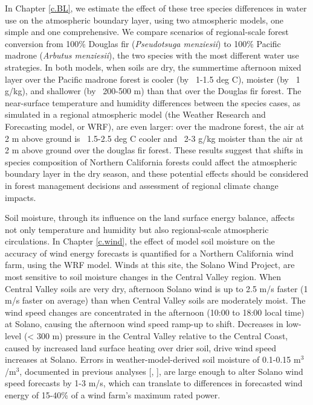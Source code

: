 In Chapter \ref{c.BL}, we estimate the effect of these tree species differences in water use on the atmospheric boundary layer, using two atmospheric models, one simple and one comprehensive. We compare scenarios of regional-scale forest conversion from 100\% Douglas fir (\textit{Pseudotsuga menziesii}) to 100\% Pacific madrone (\textit{Arbutus menziesii}), the two species with the most different water use strategies.  In both models, when soils are dry, the summertime afternoon mixed layer over the Pacific madrone forest is cooler (by ~1-1.5 deg C), moister (by ~1 g/kg), and shallower (by ~200-500 m) than that over the Douglas fir forest.  The near-surface temperature and humidity differences between the species cases, as simulated in a regional atmospheric model (the Weather Research and Forecasting model, or WRF), are even larger: over the madrone forest, the air at 2 m above ground is ~1.5-2.5 deg C cooler and ~2-3 g/kg moister than the air at 2 m above ground over the douglas fir forest.  These results suggest that shifts in species composition of Northern California forests could affect the atmospheric boundary layer in the dry season, and these potential effects should be considered in forest management decisions and assessment of regional climate change impacts.

Soil moisture, through its influence on the land surface energy balance, affects not only temperature and humidity but also regional-scale atmospheric circulations.  In Chapter \ref{c.wind}, the effect of model soil moisture on the accuracy of wind energy forecasts is quantified for a Northern California wind farm, using the WRF model.  Winds at this site, the Solano Wind Project, are most sensitive to soil moisture changes in the Central Valley region.  When Central Valley soils are very dry, afternoon Solano wind is up to 2.5 m/s faster (1 m/s faster on average) than when Central Valley soils are moderately moist.  The wind speed changes are concentrated in the afternoon (10:00 to 18:00 local time) at Solano, causing the afternoon wind speed ramp-up to shift.  Decreases in low-level (< 300 m) pressure in the Central Valley relative to the Central Coast, caused by increased land surface heating over drier soil, drive wind speed increases at Solano.  Errors in weather-model-derived soil moisture of 0.1-0.15 m$^3$/m$^3$, documented in previous analyses [\cite{marshall2003impact}, \cite{godfrey2008soil}], are large enough to alter Solano wind speed forecasts by 1-3 m/s, which can translate to differences in forecasted wind energy of 15-40\% of a wind farm's maximum rated power.


